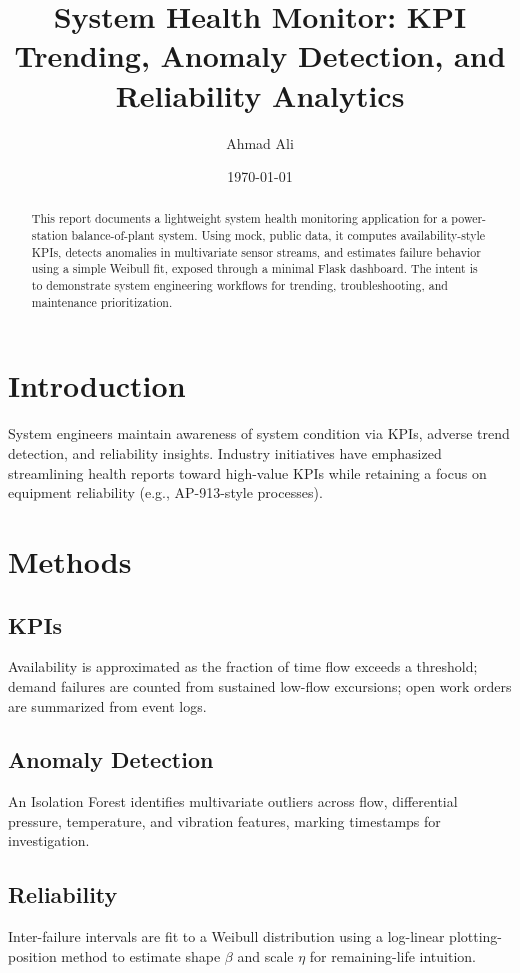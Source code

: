 \documentclass[11pt]{article}
\title{System Health Monitor: KPI Trending, Anomaly Detection, and Reliability Analytics}
\author{Ahmad Ali}
\date{\today}
\begin{document}
\maketitle

\begin{abstract}
This report documents a lightweight system health monitoring application for a power-station balance-of-plant system. Using mock, public data, it computes availability-style KPIs, detects anomalies in multivariate sensor streams, and estimates failure behavior using a simple Weibull fit, exposed through a minimal Flask dashboard. The intent is to demonstrate system engineering workflows for trending, troubleshooting, and maintenance prioritization.
\end{abstract}

\section{Introduction}
System engineers maintain awareness of system condition via KPIs, adverse trend detection, and reliability insights. Industry initiatives have emphasized streamlining health reports toward high-value KPIs while retaining a focus on equipment reliability (e.g., AP-913-style processes).

\section{Methods}
\subsection{KPIs}
Availability is approximated as the fraction of time flow exceeds a threshold; demand failures are counted from sustained low-flow excursions; open work orders are summarized from event logs.

\subsection{Anomaly Detection}
An Isolation Forest identifies multivariate outliers across flow, differential pressure, temperature, and vibration features, marking timestamps for investigation.

\subsection{Reliability}
Inter-failure intervals are fit to a Weibull distribution using a log-linear plotting-position method to estimate shape $\beta$ and scale $\eta$ for remaining-life intuition.
\end{document}

